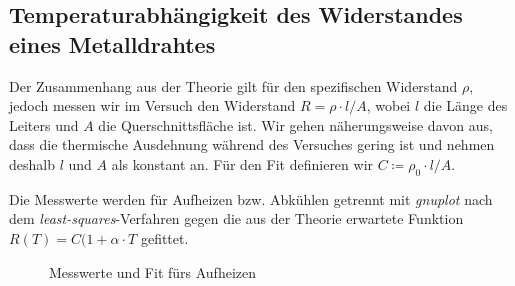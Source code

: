 \subsection{Temperaturabhängigkeit des Widerstandes eines Metalldrahtes}
Der Zusammenhang aus der Theorie gilt für den spezifischen Widerstand $\rho$, jedoch messen wir im Versuch den Widerstand $R=\rho\cdot l/A$, wobei $l$ die Länge des Leiters und $A$ die Querschnittsfläche ist. Wir gehen näherungsweise davon aus, dass die thermische Ausdehnung während des Versuches gering ist und nehmen deshalb $l$ und $A$ als konstant an. Für den Fit definieren wir $C\coloneqq \rho_0\cdot l/A$.

Die Messwerte werden für Aufheizen bzw. Abkühlen getrennt mit \emph{gnuplot} nach dem \emph{least-squares}-Verfahren gegen die aus der Theorie erwartete Funktion $R(T)=C(1+\alpha\cdot T$ gefittet. 
\begin{figure}[H]
\centering
{}
\caption{Messwerte und Fit fürs Aufheizen}
\label{fig:aufheizen}
\end{figure}

